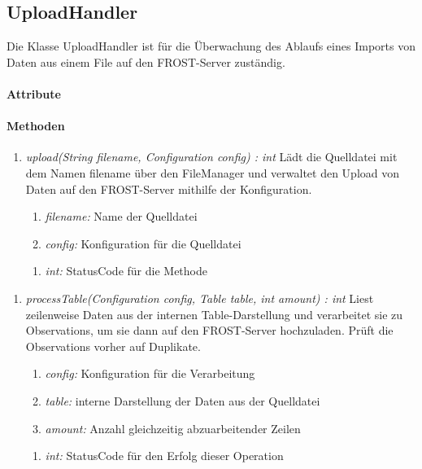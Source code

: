 \subsection{UploadHandler}
\label{uploadHandler}
Die Klasse UploadHandler ist für die Überwachung des Ablaufs eines Imports von Daten aus einem File auf den FROST-Server zuständig.

\paragraph{Attribute}
\paragraph{Methoden}
\begin{enumerate}[+]
\item \textit{upload(String filename, Configuration config) : int}
Lädt die Quelldatei mit dem Namen filename über den FileManager und verwaltet den Upload von Daten auf den FROST-Server mithilfe der Konfiguration.
\begin{enumerate}[$\bullet$]
\item \textit{filename:} Name der Quelldatei
\item \textit{config:} Konfiguration für die Quelldatei 
\end{enumerate}
\vspace{-0.2cm}
\begin{enumerate}[$\circ$]
\item \textit{int:} StatusCode für die Methode
\end{enumerate}
\end{enumerate}

\begin{enumerate}[$-$]
\item \textit{processTable(Configuration config, Table table, int amount) : int} Liest zeilenweise Daten aus der internen Table-Darstellung und verarbeitet sie zu Observations, um sie dann auf den FROST-Server hochzuladen. Prüft die Observations vorher auf Duplikate.
\begin{enumerate}[$\bullet$]
\item \textit{config:} Konfiguration für die Verarbeitung
\item \textit{table:} interne Darstellung der Daten aus der Quelldatei
\item \textit{amount:} Anzahl gleichzeitig abzuarbeitender Zeilen
\end{enumerate}
\vspace{-0.2cm}
\begin{enumerate}[$\circ$]
\item \textit{int:} StatusCode für den Erfolg dieser Operation
\end{enumerate}
\end{enumerate}